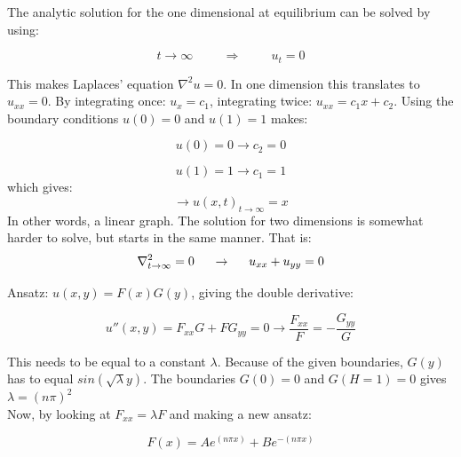\documentclass[10pt,a4paper]{article}
\begin{document}
\noindent The analytic solution for the one dimensional at equilibrium can be solved by using:


\begin{equation} 
t\rightarrow\infty \hspace{1cm} \Rightarrow \hspace{1cm}u_t=0
\end{equation}

\noindent This makes Laplaces' equation $\nabla^2u=0$. In one dimension this translates to $u_{xx}=0$. By integrating once: $u_x=c_1$, integrating twice: $u_{xx}=c_1x+c_2$. Using the boundary conditions $u(0)=0$ and $u(1)=1$ makes:

\begin{equation}
u(0)=0\rightarrow c_2=0
\end{equation}

\begin{equation}
u(1)=1 \rightarrow c_1=1
\end{equation}
which gives:
\begin{equation}
\rightarrow u(x,t)_{t\rightarrow\infty}=x
\end{equation}
\noindent In other words, a linear graph. The solution for two dimensions is somewhat harder to solve, but starts in the same manner. That is:\\

\begin{equation}
\nabla^2_{t\rightarrow \infty}=0 \hspace{0.5cm} \rightarrow \hspace{0.5cm} u_{xx}+u_{yy}=0
\end{equation}

\noindent Ansatz: $u(x,y)=F(x)G(y)$, giving the double derivative: 

\begin{equation}
u''(x,y)=F_{xx}G+FG_{yy}=0 \rightarrow \frac{F_{xx}}{F}=-\frac{G_{yy}}{G}
\end{equation}

\noindent This needs to be equal to a constant $\lambda$. Because of the given boundaries, $G(y)$ has to equal $sin(\sqrt{\lambda}y)$. The boundaries $G(0)=0$ and $G(H=1)=0$ gives $\lambda=(n\pi)^2$\\

\noindent Now, by looking at $F_{xx}=\lambda F$ and making a new ansatz: 

\begin{equation}
F(x)=Ae^{(n\pi x)}+Be^{-(n\pi x)}
\end{equation}
\end{document}
